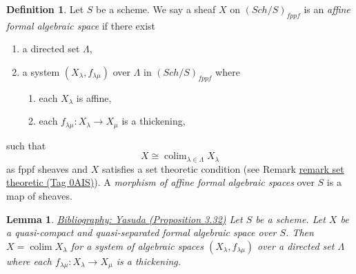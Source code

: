 \documentclass{amsart}
\newenvironment{reference}{\comment}{\endcomment}
\theoremstyle{plain}
\newtheorem{lemma}[subsection]{Lemma}
\theoremstyle{definition}
\newtheorem{definition}[subsection]{Definition}
\theoremstyle{remark}
\numberwithin{equation}{subsection}
\def\colim{\mathop{\mathrm{colim}}\nolimits}
\def\Sch{\mathit{Sch}}
\begin{document}
\begin{definition}
\label{definition-affine-formal-algebraic-space}
Let $S$ be a scheme. We say a sheaf $X$ on $(\Sch/S)_{fppf}$ is an
{\it affine formal algebraic space} if there exist
\begin{enumerate}
\item a directed set $\Lambda$,
\item a system $(X_\lambda, f_{\lambda \mu})$ over $\Lambda$
in $(\Sch/S)_{fppf}$ where
\begin{enumerate}
\item each $X_\lambda$ is affine,
\item each $f_{\lambda \mu} : X_\lambda \to X_\mu$ is a thickening,
\end{enumerate}
\end{enumerate}
such that
$$
X \cong \colim_{\lambda \in \Lambda} X_\lambda
$$
as fppf sheaves and $X$ satisfies a set theoretic condition
(see Remark \href{https://stacks.math.columbia.edu/tag/0AIS}{remark set theoretic (Tag 0AIS)}). A
{\it morphism of affine formal algebraic spaces}
over $S$ is a map of sheaves.
\end{definition}

\begin{lemma}
\label{lemma-structure-quasi-compact-quasi-separated}
\begin{reference}
\href{https://stacks.math.columbia.edu/bibliography}{Bibliography: Yasuda (Proposition 3.32)}
\end{reference}
Let $S$ be a scheme. Let $X$ be a quasi-compact and quasi-separated
formal algebraic space over $S$. Then $X = \colim X_\lambda$
for a system of algebraic spaces $(X_\lambda, f_{\lambda \mu})$
over a directed set $\Lambda$ where each
$f_{\lambda \mu} : X_\lambda \to X_\mu$ is a thickening.
\end{lemma}
\end{document}
